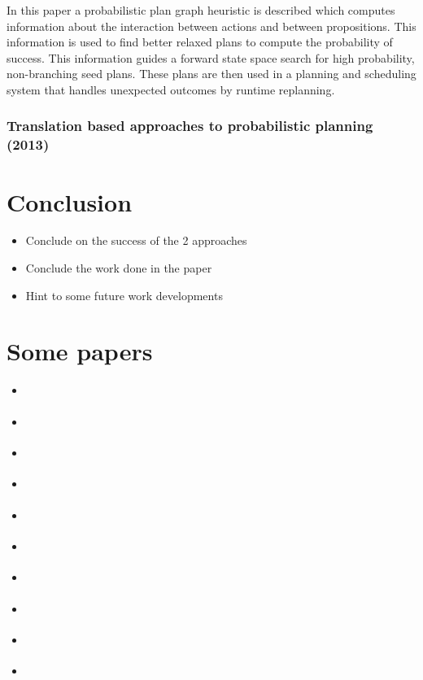 \documentclass[runningheads,a4paper]{llncs}
\begin{document}
In this paper a probabilistic plan graph heuristic is described which computes
information about the interaction between actions and between propositions.
This information is used to find better relaxed plans to compute the
probability of success. This information guides a forward state space search
for high probability, non-branching seed plans. These plans are then used in
a planning and scheduling system that handles unexpected outcomes by runtime
replanning.

\subsubsection{Translation based approaches to probabilistic planning (2013)~\cite{taig2013translation}}


\section{Conclusion}

\begin{itemize}
	\item Conclude on the success of the 2 approaches
	\item Conclude the work done in the paper
	\item Hint to some future work developments
\end{itemize}

\section{Some papers}

\begin{itemize}
	\item \cite{Hoffmann01theff}
	\item \cite{FFReplan}
	\item \cite{teichteil2010incremental}
	\item \cite{yoon2008probabilistic}
	\item \cite{teichteil2012fast}
	\item \cite{bonet2011planning}
	\item \cite{taig2013translation}
	\item \cite{martin2013progressive}
	\item \cite{taig2013conformant}
	\item \cite{2013workshop}
\end{itemize}




\end{document}
